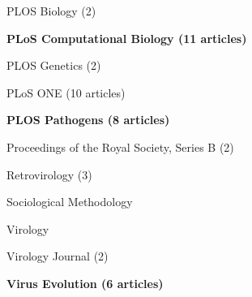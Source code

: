 \documentclass[11pt]{moderncv}
\begin{document}
{\begin{cvitemize}
\item PLOS Biology         (2)                         
\item \textbf{PLoS Computational Biology     (11 articles)}
\item PLOS Genetics                                 (2)
\item PLoS ONE                                      (10 articles)
\item \textbf{PLOS Pathogens         (8 articles)}
\item Proceedings of the Royal Society, Series B    (2)
\item Retrovirology                                 (3)
\item Sociological Methodology                      
\item Virology                                      
\item Virology Journal                              (2)
\item \textbf{Virus Evolution           (6 articles)}
\end{cvitemize}
}
\end{document}
